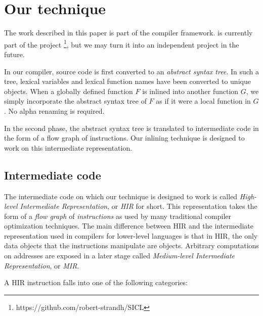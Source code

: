 \section{Our technique}

The work described in this paper is part of the \cleavir{} compiler
framework.  \cleavir{} is currently part of the \sicl{} project%
\footnote{https://github.com/robert-strandh/SICL}, but we may turn it
into an independent project in the future.

In our compiler, source code is first converted to an \emph{abstract
  syntax tree}.  In such a tree, lexical variables and lexical
function names have been converted to unique objects.  When a globally
defined function $F$ is inlined into another function $G$, we simply
incorporate the abstract syntax tree of $F$ as if it were a local
function in $G$.  No alpha renaming is required.

In the second phase, the abstract syntax tree is translated to
intermediate code in the form of a flow graph of instructions.  Our
inlining technique is designed to work on this intermediate
representation.

\subsection{Intermediate code}

The intermediate code on which our technique is designed to work is
called \emph{High-level Intermediate Representation}, or \emph{HIR}
for short.  This representation takes the form of a \emph{flow graph}
of \emph{instructions} as used by many traditional compiler
optimization techniques.  The main difference between HIR and the
intermediate representation used in compilers for lower-level
languages is that in HIR, the only data objects that the instructions
manipulate are \commonlisp{} objects.  Arbitrary computations on
addresses are exposed in a later stage called \emph{Medium-level
  Intermediate Representation}, or \emph{MIR}.

A HIR instruction falls into one of the following categories:

